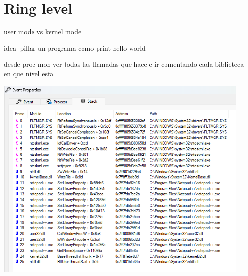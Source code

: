 \section{Ring level}

user mode vs kernel mode

idea: pillar un programa como print hello world

desde proc mon ver todas las llamadas que hace e ir comentando cada biblioteca 
en que nivel esta

\begin{center}
    \includegraphics[width=0.95\textwidth]{figures/fig-syscall-path.png}
\end{center}